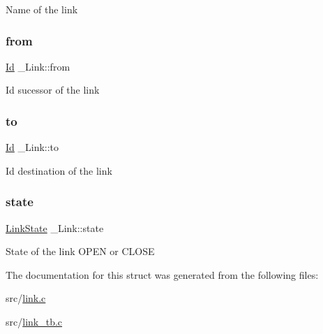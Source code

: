Name of the link \mbox{\label{struct__Link_ae33a61999d11b202a1e1af285aaa84b0}} 
\subsubsection{\texorpdfstring{from}{from}}
{\footnotesize\ttfamily \hyperlink{types_8h_a845e604fb28f7e3d97549da3448149d3}{Id} \+\_\+\+Link\+::from}

Id sucessor of the link \mbox{\label{struct__Link_a54563ccd62fdc5057f55fa8f205d928c}} 
\subsubsection{\texorpdfstring{to}{to}}
{\footnotesize\ttfamily \hyperlink{types_8h_a845e604fb28f7e3d97549da3448149d3}{Id} \+\_\+\+Link\+::to}

Id destination of the link \mbox{\label{struct__Link_a58ecee77b2af4dddadb7e8ff94fa0d15}} 
\subsubsection{\texorpdfstring{state}{state}}
{\footnotesize\ttfamily \hyperlink{link_8h_ab0033b911037fd995258d117e65461e0}{Link\+State} \+\_\+\+Link\+::state}

State of the link O\+P\+EN or C\+L\+O\+SE 

The documentation for this struct was generated from the following files\+:\begin{DoxyCompactItemize}
\item 
src/\hyperlink{link_8c}{link.\+c}\item 
src/\hyperlink{link__tb_8c}{link\+\_\+tb.\+c}\end{DoxyCompactItemize}
